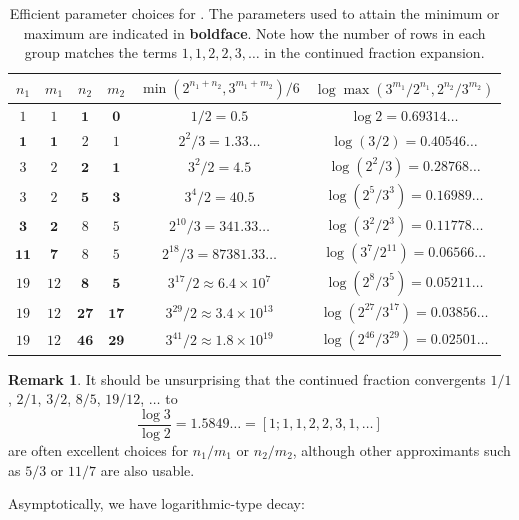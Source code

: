 \documentclass[12pt,a4paper,reqno]{amsart}
\numberwithin{equation}{section}
\theoremstyle{plain}
\theoremstyle{definition}
\newtheorem{remark}[theorem]{Remark}
\begin{document}
\begin{table}[ht]
\centering
\begin{tabular}{|c|c|c|c|c|c|}
\hline
$n_1$ & $m_1$ & $n_2$ & $m_2$ & $\min(2^{n_1+n_2},3^{m_1+m_2})/6$ & $\log \max(3^{m_1}/2^{n_1}, 2^{n_2}/3^{m_2})$ \\
\hline
$1$ & $1$ & $\mathbf{1}$ & $\mathbf{0}$ & $1/2 = 0.5$ & $\log 2 = 0.69314\dots$ \\
\hline
$\mathbf{1}$ & $\mathbf{1}$ & $2$ & $1$ & $2^2/3 = 1.33\dots$ & $\log (3/2) = 0.40546\dots$\\
\hline
$3$ & $2$ & $\mathbf{2}$ & $\mathbf{1}$ & $3^2/2 = 4.5$ & $\log (2^2/3) = 0.28768\dots$ \\
$3$ & $2$ & $\mathbf{5}$ & $\mathbf{3}$ & $3^4/2 = 40.5$ & $\log (2^5/3^3) = 0.16989\dots$ \\
\hline
$\mathbf{3}$ & $\mathbf{2}$ & $8$ & $5$ & $2^{10}/3 = 341.33\dots$ & $\log (3^2/2^3) = 0.11778\dots$\\ 
$\mathbf{11}$ & $\mathbf{7}$ & $8$ & $5$ & $2^{18}/3 = 87381.33\dots$ & $\log (3^7/2^{11}) = 0.06566\dots$ \\
\hline
$19$ & $12$ & $\mathbf{8}$ & $\mathbf{5}$ & $3^{17}/2 \approx 6.4 \times 10^7$ & $\log (2^8/3^5) = 0.05211\dots$ \\
$19$ & $12$ & $\mathbf{27}$ & $\mathbf{17}$ & $3^{29}/2 \approx 3.4 \times 10^{13}$ & $\log (2^{27}/3^{17}) = 0.03856\dots$ \\
$19$ & $12$ & $\mathbf{46}$ & $\mathbf{29}$ & $3^{41}/2 \approx 1.8 \times 10^{19} $ & $\log (2^{46}/3^{29}) = 0.02501\dots$ \\
\hline
\end{tabular}
\caption{Efficient parameter choices for .  The parameters used to attain the minimum or maximum are indicated in \textbf{boldface}. Note how the number of rows in each group matches the terms $1,1,2,2,3,\dots$ in the continued fraction expansion.}\label{approx-table}
\end{table}

\begin{remark}
It should be unsurprising that the continued fraction convergents $1/1$, $2/1$, $3/2$, $8/5$, $19/12$, $\dots$ to 
$$\frac{\log 3}{\log 2} = 1.5849\dots = [1; 1,1,2,2,3,1,\dots]$$
are often excellent choices for $n_1/m_1$ or $n_2/m_2$, although other approximants such as $5/3$ or $11/7$ are also usable.
\end{remark}

Asymptotically, we have logarithmic-type decay:
\end{document}
